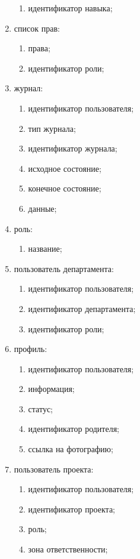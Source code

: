 \begin{enumerate}
\begin{enumerate}
      \item идентификатор навыка;
    \end{enumerate}
  \item список прав:
    \begin{enumerate}
      \item права;
      \item идентификатор роли;
    \end{enumerate}
  \item журнал:
    \begin{enumerate}
      \item идентификатор пользователя;
      \item тип журнала;
      \item идентификатор журнала;
      \item исходное состояние;
      \item конечное состояние;
      \item данные;
    \end{enumerate}
  \item роль:
    \begin{enumerate}
      \item название;
    \end{enumerate}
  \item пользователь департамента:
    \begin{enumerate}
      \item идентификатор пользователя;
      \item идентификатор департамента;
      \item идентификатор роли;
    \end{enumerate}
  \item профиль:
    \begin{enumerate}
      \item идентификатор пользователя;
      \item информация;
      \item статус;
      \item идентификатор родителя;
      \item ссылка на фотографию;
    \end{enumerate}
  \item пользователь проекта:
    \begin{enumerate}
      \item идентификатор пользователя;
      \item идентификатор проекта;
      \item роль;
      \item зона ответственности;

\end{enumerate}
\end{enumerate}
